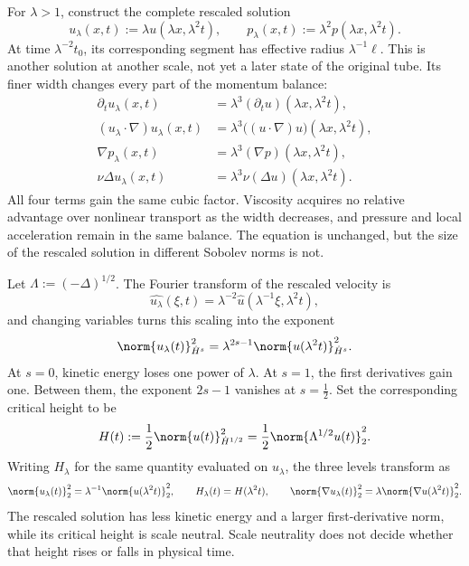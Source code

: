 For \(\lambda>1\), construct the complete rescaled solution
\[
  u_\lambda(x,t)
  :=
  \lambda u(\lambda x,\lambda^2t),
  \qquad
  p_\lambda(x,t)
  :=
  \lambda^2p(\lambda x,\lambda^2t).
\]
At time \(\lambda^{-2}t_0\), its corresponding segment has effective radius \(\lambda^{-1}\ell\). This is another solution at another scale, not yet a later state of the original tube. Its finer width changes every part of the momentum balance:
\[
\begin{aligned}
  \partial_tu_\lambda(x,t)
  &=
  \lambda^3(\partial_tu)(\lambda x,\lambda^2t),
  \\
  (u_\lambda\cdot\nabla)u_\lambda(x,t)
  &=
  \lambda^3\bigl((u\cdot\nabla)u\bigr)(\lambda x,\lambda^2t),
  \\
  \nabla p_\lambda(x,t)
  &=
  \lambda^3(\nabla p)(\lambda x,\lambda^2t),
  \\
  \nu\Delta u_\lambda(x,t)
  &=
  \lambda^3\nu(\Delta u)(\lambda x,\lambda^2t).
\end{aligned}
\]
All four terms gain the same cubic factor. Viscosity acquires no relative advantage over nonlinear transport as the width decreases, and pressure and local acceleration remain in the same balance. The equation is unchanged, but the size of the rescaled solution in different Sobolev norms is not.


Let \(\Lambda:=(-\Delta)^{1/2}\). The Fourier transform of the rescaled velocity is
\[
  \widehat{u_\lambda}(\xi,t)
  =
  \lambda^{-2}\widehat u(\lambda^{-1}\xi,\lambda^2t),
\]
and changing variables turns this scaling into the exponent
\[
  \norm{u_\lambda(t)}_{\dot H^s}^2
  =
  \lambda^{2s-1}
  \norm{u(\lambda^2t)}_{\dot H^s}^2.
\]
At \(s=0\), kinetic energy loses one power of \(\lambda\). At \(s=1\), the first derivatives gain one. Between them, the exponent \(2s-1\) vanishes at \(s=\tfrac12\). Set the corresponding critical height to be
\[
  H(t)
  :=
  \frac12\norm{u(t)}_{\dot H^{1/2}}^2
  =
  \frac12\norm{\Lambda^{1/2}u(t)}_2^2.
\]
Writing \(H_\lambda\) for the same quantity evaluated on \(u_\lambda\), the three levels transform as
\[
  \norm{u_\lambda(t)}_2^2
  =
  \lambda^{-1}\norm{u(\lambda^2t)}_2^2,
  \qquad
  H_\lambda(t)=H(\lambda^2t),
  \qquad
  \norm{\nabla u_\lambda(t)}_2^2
  =
  \lambda\norm{\nabla u(\lambda^2t)}_2^2.
\]
The rescaled solution has less kinetic energy and a larger first-derivative norm, while its critical height is scale neutral. Scale neutrality does not decide whether that height rises or falls in physical time.


